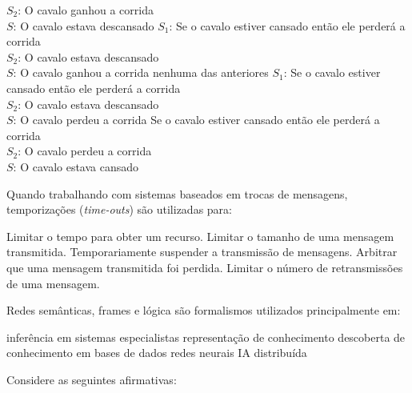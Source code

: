 \documentclass[12pt, addpoints]{exam}
\begin{document}
\begin{questions}
\begin{choices}
              \( S_2 \): O cavalo ganhou a corrida \\

              \( S \): O cavalo estava descansado
\choice \( S_1 \): Se o cavalo estiver cansado então ele perderá a corrida \\

              \( S_2 \): O cavalo estava descansado \\

              \( S \): O cavalo ganhou a corrida
\choice nenhuma das anteriores
\choice \( S_1 \): Se o cavalo estiver cansado então ele perderá a corrida \\

              \( S_2 \): O cavalo estava descansado \\

              \( S \): O cavalo perdeu a corrida
\choice Se o cavalo estiver cansado então ele perderá a corrida \\

              \( S_2 \): O cavalo perdeu a corrida \\

              \( S \): O cavalo estava cansado
\end{choices}

\question

Quando trabalhando com sistemas baseados em trocas de mensagens, temporizações (\textit{time-outs}) são utilizadas para:


\begin{choices}
\choice Limitar o tempo para obter um recurso.
\choice Limitar o tamanho de uma mensagem transmitida.
\choice Temporariamente suspender a transmissão de mensagens.
\choice Arbitrar que uma mensagem transmitida foi perdida.
\choice Limitar o número de retransmissões de uma mensagem.
\end{choices}

\question

Redes semânticas, frames e lógica são formalismos utilizados principalmente em: 
\begin{choices}
\choice inferência em sistemas especialistas
\choice representação de conhecimento
\choice descoberta de conhecimento em bases de dados
\choice redes neurais
\choice IA distribuída
\end{choices}

\question

Considere as seguintes afirmativas:

\begin{itemize}


\end{itemize}
\end{questions}
\end{document}
